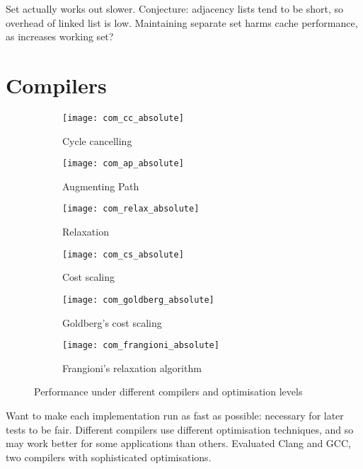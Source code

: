 Set actually works out slower. Conjecture: adjacency lists tend to be short, so overhead of linked list is low. Maintaining separate set harms cache performance, as increases working set?


\section{Compilers}

\begin{figure}
    \centering
    \begin{subfigure}[c]{0.45\textwidth}
        \texttt{[image: com\_cc\_absolute]}
        \caption{Cycle cancelling}
    \end{subfigure}
    \begin{subfigure}[c]{0.45\textwidth}
        \texttt{[image: com\_ap\_absolute]}
        \caption{Augmenting Path}
    \end{subfigure}
    \begin{subfigure}[c]{0.45\textwidth}
        \texttt{[image: com\_relax\_absolute]}
        \caption{Relaxation}
    \end{subfigure}
    \begin{subfigure}[c]{0.45\textwidth}
        \texttt{[image: com\_cs\_absolute]}
        \caption{Cost scaling}
    \end{subfigure}
    \begin{subfigure}[c]{0.45\textwidth}
        \texttt{[image: com\_goldberg\_absolute]}
        \caption{Goldberg's cost scaling}
    \end{subfigure}
    \begin{subfigure}[c]{0.45\textwidth}
        \texttt{[image: com\_frangioni\_absolute]}
        \caption{Frangioni's relaxation algorithm}
    \end{subfigure}
    \caption{Performance under different compilers and optimisation levels}
    \label{fig:compilers}
\end{figure}

Want to make each implementation run as fast as possible: necessary for later tests to be fair. Different compilers use different optimisation techniques, and so may work better for some applications than others. Evaluated Clang and GCC, two compilers with sophisticated optimisations.

